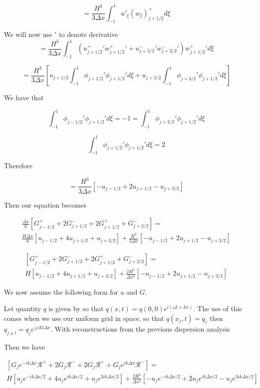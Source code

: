 \documentclass[12pt]{article}
\begin{document}
\[= \frac{H^3}{3\Delta x}\int_{-1}^{1}u'_{\xi}(w_{\xi})^+_{j+1/2} d\xi   \]

We will now use $'$ to denote derivative
\[= \frac{H^3}{3\Delta x}\int_{-1}^{1}\left(u^+_{j+ 1/2} ' w^+_{j+1/2} ' +u^-_{j+ 3/2}'w^-_{j+ 3/2} ' \right)w^+_{j+1/2} ' d\xi   \]

\[= \frac{H^3}{3\Delta x}\left[u_{j+1/2} \int_{-1}^{1} \phi_{j+1/2}'\phi_{j+1/2}' d\xi +  u_{j+3/2} \int_{-1}^{1} \phi_{j  +3/2}'\phi_{j+1/2}' d\xi\right]   \]

We have that 

\[\int_{-1}^{1} \phi_{j-1/2}'\phi_{j+1/2}' d\xi = -1 = \int_{-1}^{1} \phi_{j+3/2}'\phi_{j+1/2}' d\xi \]

\[\int_{-1}^{1} \phi_{j+1/2}'\phi_{j+1/2}' d\xi = 2\]

Therefore

\[= \frac{H^3}{3\Delta x}\left[-u_{j- 1/2}  + 2u_{j+1/2} -  u_{j+3/2} \right]   \]

Then our equation becomes

\begin{multline}
\frac{\Delta x}{6}  \left[G^+_{j- 1/2} +  2G^-_{j+ 1/2} +  2G^+_{j+ 1/2}  +  G^-_{j+ 3/2}\right] = \\ \frac{H\Delta x}{6} \left[u_{j- 1/2} + 4u_{j+1/2} + u_{j+3/2}\right] +  \frac{H^3}{3\Delta x}\left[-u_{j- 1/2}  + 2u_{j+1/2} -  u_{j+3/2} \right]
\end{multline}

\begin{multline}
\left[G^+_{j- 1/2} +  2G^-_{j+ 1/2} +  2G^+_{j+ 1/2}  +  G^-_{j+ 3/2}\right] = \\ H\left[u_{j- 1/2} + 4u_{j+1/2} + u_{j+3/2}\right] +  \frac{2H^3}{\Delta x^2}\left[-u_{j- 1/2}  + 2u_{j+1/2} -  u_{j+3/2} \right]
\end{multline}

 

We now assume the following form for $u$ and $G$.

Let quantity $q$ is given by so that
$q(x,t) = q(0,0) e^{i\left(\omega t + kx\right)}$. The use of this comes when we use our uniform grid in space, so that $q(x_j,t) = q_j$ then $q_{j \pm l} = q_j e^{\pm ik l\Delta x} $. With reconstructions from the previous dispersion analysis

Then we have 

\begin{multline}
\left[ G_je^{- ik\Delta x} \mathcal{R}^+ +  2G_j \mathcal{R}^- +  2G_j \mathcal{R}^+  +  G_je^{ik\Delta x} \mathcal{R}^-\right] = \\ H\left[u_{j}e^{- ik\Delta x/2} + 4u_{j}e^{ ik\Delta x/2} + u_{j}e^{ 3ik\Delta x/2}\right] +  \frac{2H^3}{\Delta x^2}\left[-u_{j}e^{- ik\Delta x/2}  + 2u_{j}e^{ ik\Delta x/2} -  u_{j}e^{ 3ik\Delta x/2} \right]
\end{multline}
\end{document}
